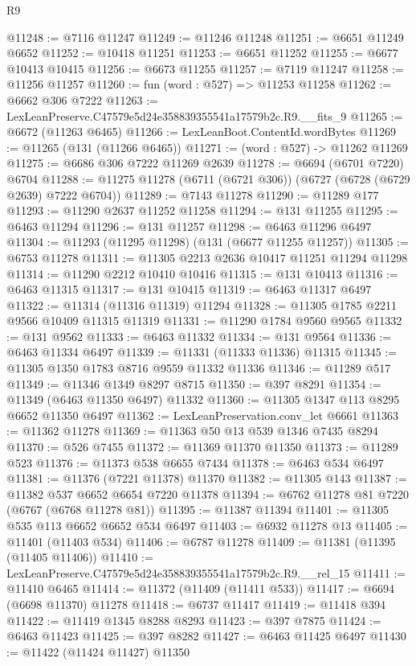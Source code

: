 \begin{lexlean}{R9}
\begin{coremodule}
@11248 := @7116 @11247
@11249 := @11246 @11248
@11251 := @6651 @11249 @6652
@11252 := @10418 @11251
@11253 := @6651 @11252
@11255 := @6677 @10413 @10415
@11256 := @6673 @11255
@11257 := @7119 @11247
@11258 := @11256 @11257
@11260 := fun (word : @527) => @11253 @11258
@11262 := @6662 @306 @7222
@11263 := LexLeanPreserve.C47579e5d24e358839355541a17579b2c.R9.__fits_9
@11265 := @6672 (@11263 @6465)
@11266 := LexLeanBoot.ContentId.wordBytes
@11269 := @11265 (@131 (@11266 @6465))
@11271 := (word : @527) -> @11262 @11269
@11275 := @6686 @306 @7222 @11269 @2639
@11278 := @6694 (@6701 @7220) @6704
@11288 := @11275 @11278 (@6711 (@6721 @306)) (@6727 (@6728 (@6729 @2639) @7222 @6704))
@11289 := @7143 @11278
@11290 := @11289 @177
@11293 := @11290 @2637 @11252 @11258
@11294 := @131 @11255
@11295 := @6463 @11294
@11296 := @131 @11257
@11298 := @6463 @11296 @6497
@11304 := @11293 (@11295 @11298) (@131 (@6677 @11255 @11257))
@11305 := @6753 @11278
@11311 := @11305 @2213 @2636 @10417 @11251 @11294 @11298
@11314 := @11290 @2212 @10410 @10416
@11315 := @131 @10413
@11316 := @6463 @11315
@11317 := @131 @10415
@11319 := @6463 @11317 @6497
@11322 := @11314 (@11316 @11319) @11294
@11328 := @11305 @1785 @2211 @9566 @10409 @11315 @11319
@11331 := @11290 @1784 @9560 @9565
@11332 := @131 @9562
@11333 := @6463 @11332
@11334 := @131 @9564
@11336 := @6463 @11334 @6497
@11339 := @11331 (@11333 @11336) @11315
@11345 := @11305 @1350 @1783 @8716 @9559 @11332 @11336
@11346 := @11289 @517
@11349 := @11346 @1349 @8297 @8715
@11350 := @397 @8291
@11354 := @11349 (@6463 @11350 @6497) @11332
@11360 := @11305 @1347 @113 @8295 @6652 @11350 @6497
@11362 := LexLeanPreservation.conv_let @6661
@11363 := @11362 @11278
@11369 := @11363 @50 @13 @539 @1346 @7435 @8294
@11370 := @526 @7455
@11372 := @11369 @11370 @11350
@11373 := @11289 @523
@11376 := @11373 @538 @6655 @7434
@11378 := @6463 @534 @6497
@11381 := @11376 (@7221 @11378) @11370
@11382 := @11305 @143
@11387 := @11382 @537 @6652 @6654 @7220 @11378
@11394 := @6762 @11278 @81 @7220 (@6767 (@6768 @11278 @81))
@11395 := @11387 @11394
@11401 := @11305 @535 @113 @6652 @6652 @534 @6497
@11403 := @6932 @11278 @13
@11405 := @11401 (@11403 @534)
@11406 := @6787 @11278
@11409 := @11381 (@11395 (@11405 @11406))
@11410 := LexLeanPreserve.C47579e5d24e358839355541a17579b2c.R9.__rel_15
@11411 := @11410 @6465
@11414 := @11372 (@11409 (@11411 @533))
@11417 := @6694 (@6698 @11370) @11278
@11418 := @6737 @11417
@11419 := @11418 @394
@11422 := @11419 @1345 @8288 @8293
@11423 := @397 @7875
@11424 := @6463 @11423
@11425 := @397 @8282
@11427 := @6463 @11425 @6497
@11430 := @11422 (@11424 @11427) @11350

\end{coremodule}
\end{lexlean}
